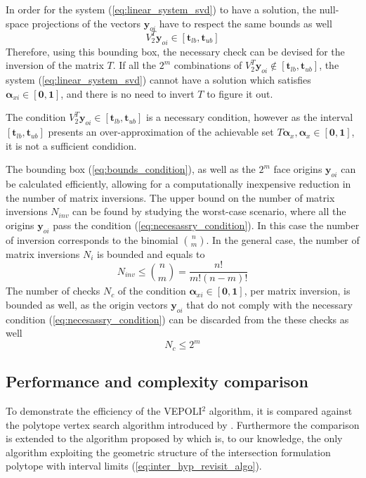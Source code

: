 In order for the system (\ref{eq:linear_system_svd}) to have a solution, the null-space projections of the vectors $\bm{y}_{oi}$ have to respect the same bounds as well
\begin{equation}
    V_2^T\bm{y}_{oi} \in [\bm{t}_{lb}, \bm{t}_{ub}]\label{eq:necesassry_condition}
\end{equation}
Therefore, using this bounding box, the necessary check can be devised for the inversion of the matrix $T$. If all the $2^m$ combinations of $V_2^T\bm{y}_{oi} \notin [\bm{t}_{lb}, \bm{t}_{ub}] $, the system (\ref{eq:linear_system_svd}) cannot have a solution which satisfies $\bm{\alpha}_{xi} \in [\bm{0},\bm{1}]$, and there is no need to invert $T$ to figure it out.

The condition $V_2^T\bm{y}_{oi} \in [\bm{t}_{lb}, \bm{t}_{ub}] $ is a necessary condition, however as the interval $[\bm{t}_{lb}, \bm{t}_{ub}]$ presents an over-approximation of the achievable set $T\bm{\alpha}_x, \bm{\alpha}_x\in[\bm{0}, \bm{1}]$, it is not a sufficient condidion. 

The bounding box (\ref{eq:bounds_condition}), as well as the $2^m$ face origins $\bm{y}_{oi}$ can be calculated efficiently, allowing for a computationally inexpensive reduction in the number of matrix inversions. The upper bound on the number of matrix inversions $N_{inv}$ can be found by studying the worst-case scenario, where all the origins $\bm{y}_{oi}$ pass the condition (\ref{eq:necesassry_condition}). In this case the number of inversion corresponds to the binomial $\binom{n}{m}$. In the general case, the number of matrix inversions $N_i$ is bounded and equals to  
$$N_{inv}\leq\binom{n}{m}=\frac{n!}{m!(n-m)!}$$
The number of checks $N_c$ of the condition $\bm{\alpha}_{xi} \in [\bm{0},\bm{1}]$, per matrix inversion, is bounded as well, as the origin vectors $\bm{y}_{oi}$ that do not comply with the necessary condition (\ref{eq:necesassry_condition}) can be discarded from the these checks as well
$$
N_c\leq2^m
$$

\subsection{Performance and complexity comparison}\label{sec:complexity}
To demonstrate the efficiency of the VEPOLI$^2$ algorithm, it is compared against the polytope vertex search algorithm introduced by \citet{chiacchio_evaluation_1996}. Furthermore the comparison is extended to the algorithm proposed by \citet{sasaki2011vertex} which is, to our knowledge, the only algorithm exploiting the geometric structure of the intersection formulation polytope with interval limits (\ref{eq:inter_hyp_revisit_algo}).

